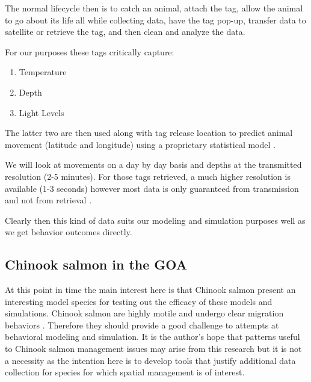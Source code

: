 \documentclass[11pt]{article}
\begin{document}
The normal lifecycle then is to catch an animal, attach the tag, allow the animal to go about its life all while collecting data, have the tag pop-up, transfer data to satellite or retrieve the tag, and then clean and analyze the data. \newline

For our purposes these tags critically capture:

\begin{enumerate}
\item Temperature
\item Depth
\item Light Levels
\end{enumerate}

The latter two are then used along with tag release location to predict animal movement (latitude and longitude) using a proprietary statistical model \citep{PSAT}. 

We will look at movements on a day by day basis and depths at the transmitted resolution (2-5 minutes). For those tags retrieved, a much higher resolution is available (1-3 seconds) however most data is only guaranteed from transmission and not from retrieval \citep{PSAT}. 
\newline

Clearly then this kind of data suits our modeling and simulation purposes well as we get behavior outcomes directly. 

\subsection{Chinook salmon in the GOA}

At this point in time the main interest here is that Chinook salmon present an interesting model species for testing out the efficacy of these models and simulations. Chinook salmon are highly motile and undergo clear migration behaviors \citep{tucker2019} \citep{langan2024}. Therefore they should provide a good challenge to attempts at behavioral modeling and simulation. It is the author's hope that patterns useful to Chinook salmon management issues may arise from this research but it is not a necessity as the intention here is to develop tools that justify additional data collection for species for which spatial management is of interest. 
\end{document}
